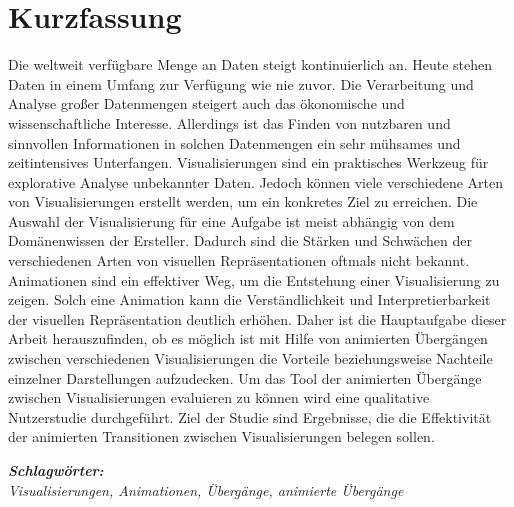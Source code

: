 
\section*{Kurzfassung}
\vspace{0.5cm}

Die weltweit verfügbare Menge an Daten steigt kontinuierlich an. Heute stehen Daten in einem Umfang zur Verfügung wie nie zuvor. Die Verarbeitung und Analyse großer Datenmengen steigert auch das ökonomische und wissenschaftliche Interesse. Allerdings ist das Finden von nutzbaren und sinnvollen Informationen in solchen Datenmengen ein sehr mühsames und zeitintensives Unterfangen. Visualisierungen sind ein praktisches Werkzeug für explorative Analyse unbekannter Daten. Jedoch können viele verschiedene Arten von Visualisierungen erstellt werden, um ein konkretes Ziel zu erreichen. Die Auswahl der Visualisierung für eine Aufgabe ist meist abhängig von dem Domänenwissen der Ersteller. Dadurch sind die Stärken und Schwächen der verschiedenen Arten von visuellen Repräsentationen oftmals nicht bekannt. Animationen sind ein effektiver Weg, um die Entstehung einer Visualisierung zu zeigen. Solch eine Animation kann die Verständlichkeit und Interpretierbarkeit der visuellen Repräsentation deutlich erhöhen. Daher ist die Hauptaufgabe dieser Arbeit herauszufinden, ob es möglich ist mit Hilfe von animierten Übergängen zwischen verschiedenen Visualisierungen die Vorteile beziehungsweise Nachteile einzelner Darstellungen aufzudecken. Um das Tool der animierten Übergänge zwischen Visualisierungen evaluieren zu können wird eine qualitative Nutzerstudie durchgeführt. Ziel der Studie sind Ergebnisse, die die Effektivität der animierten Transitionen zwischen Visualisierungen belegen sollen.

\vspace{0.5cm}
\textbf{\textit{Schlagwörter:}}\\
\textit{Visualisierungen, Animationen, Übergänge, animierte Übergänge}

